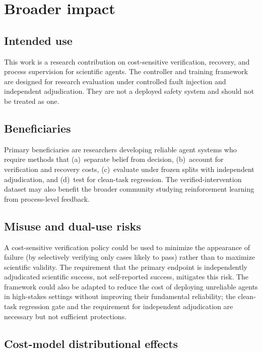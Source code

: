 \section*{Broader impact}

\subsection{Intended use}

This work is a research contribution on cost-sensitive verification,
recovery, and process supervision for scientific agents. The controller and
training framework are designed for research evaluation under controlled
fault injection and independent adjudication. They are not a deployed safety
system and should not be treated as one.

\subsection{Beneficiaries}

Primary beneficiaries are researchers developing reliable agent systems who
require methods that (a)~separate belief from decision, (b)~account for
verification and recovery costs, (c)~evaluate under frozen splits with
independent adjudication, and (d)~test for clean-task regression. The
verified-intervention dataset may also benefit the broader community
studying reinforcement learning from process-level feedback.

\subsection{Misuse and dual-use risks}

A cost-sensitive verification policy could be used to minimize the
appearance of failure (by selectively verifying only cases likely to pass)
rather than to maximize scientific validity. The requirement that the
primary endpoint is independently adjudicated scientific success, not
self-reported success, mitigates this risk. The framework could also be
adapted to reduce the cost of deploying unreliable agents in high-stakes
settings without improving their fundamental reliability; the clean-task
regression gate and the requirement for independent adjudication are
necessary but not sufficient protections.

\subsection{Cost-model distributional effects}

